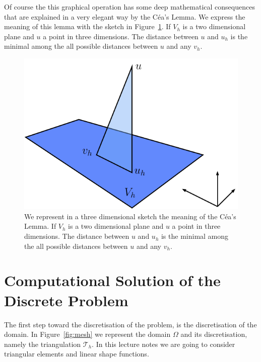 \documentclass[11pt]{amsart}
\begin{document}
Of course the this graphical operation has some deep mathematical consequences
that are explained in a very elegant way by the C\'ea's Lemma. We express the 
meaning of this lemma with the sketch in Figure~\ref{fig:cea_lemma}. If $V_h$ is a two dimensional plane and $u$ a point in three dimensions. The distance between $u$ and $u_h$ is the minimal among the all possible distances 
between $u$ and any $v_h$.
\begin{figure}[h]
\centering
\includegraphics[scale=1]{cea_lemma-pics.pdf}
\caption{We represent in a three dimensional sketch the meaning of the C\'ea's Lemma.
If $V_h$ is a two dimensional plane and $u$ a point in three dimensions. The distance between $u$ and $u_h$ is the minimal among the all possible distances 
between $u$ and any $v_h$.}
\label{fig:cea_lemma}
\end{figure}

\section{Computational Solution of the Discrete Problem}

The first step toward the discretisation of the problem, is the discretisation 
of the domain. In Figure~\ref{fig:mesh} we represent the domain $\Omega$ and its 
discretisation, namely the triangulation $\mathcal{T}_h$. In this lecture notes we are 
going to consider triangular elements and linear shape functions. 
\end{document}
